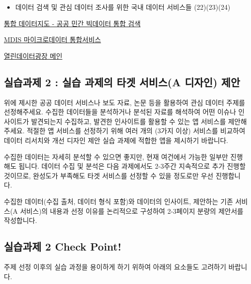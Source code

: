 \documentclass[
  letterpaper,
]{book}
\providecommand{\tightlist}{%
  \setlength{\itemsep}{0pt}\setlength{\parskip}{0pt}}\usepackage{longtable,booktabs,array}
\begin{document}
\begin{itemize}
\tightlist
\item
  데이터 검색 및 관심 데이터 조사를 위한 국내 데이터 서비스들
  (22)(23)(24)
\end{itemize}

\href{https://www.bigdata-map.kr}{통합 데이터지도 - 공공 민간 빅데이터
통합 검색}

\href{https://mdis.kostat.go.kr/index.do}{MDIS 마이크로데이터
통합서비스}

\href{https://data.seoul.go.kr}{열린데이터광장 메인}

\subsection{실습과제 2 : 실습 과제의 타겟 서비스(A 디자인)
제안}\label{uxc2e4uxc2b5uxacfcuxc81c-2-uxc2e4uxc2b5-uxacfcuxc81cuxc758-uxd0c0uxac9f-uxc11cuxbe44uxc2a4a-uxb514uxc790uxc778-uxc81cuxc548-1}

위에 제시한 공공 데이터 서비스나 보도 자료, 논문 등을 활용하여 관심
데이터 주제를 선정해주세요. 수집한 데이터들을 분석하거나 분석된 자료를
해석하여 어떤 이슈나 인사이트가 발견되는지 수집하고, 발견한 인사이트를
활용할 수 있는 앱 서비스를 제안해주세요. 적절한 앱 서비스를 선정하기
위해 여러 개의 (3가지 이상) 서비스를 비교하여 데이터 리서치와 개선
디자인 제안 실습 과제에 적합한 앱을 제시하기 바랍니다.

수집한 데이터는 자세히 분석할 수 있으면 좋지만, 현재 여건에서 가능한
일부만 진행해도 됩니다. 데이터 수집 및 분석은 다음 과제에서도 2-3주간
지속적으로 추가 진행할 것이므로, 완성도가 부족해도 타겟 서비스를 선정할
수 있을 정도로만 우선 진행합니다.

수집한 데이터(수집 출처, 데이터 형식 포함)와 데이터의 인사이트, 제안하는
기존 서비스(A 서비스)의 내용과 선정 이유를 논리적으로 구성하여 2-3페이지
분량의 제안서를 작성합니다.

\subsection{실습과제 2 Check
Point!}\label{uxc2e4uxc2b5uxacfcuxc81c-2-check-point-1}

주제 선정 이후의 실습 과정을 용이하게 하기 위하여 아래의 요소들도
고려하기 바랍니다.
\end{document}
